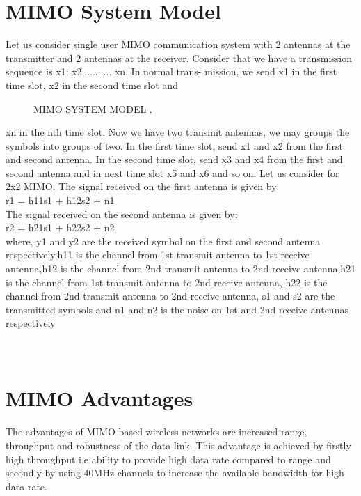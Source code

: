 \documentclass[12pt]{report}
\begin{document}
\section*{MIMO System Model}
Let us consider single user MIMO communication system with 2 antennas at the transmitter and 2 antennas at the receiver. Consider that
we have a transmission sequence is x1; x2;.......... xn. In normal trans-
mission, we send x1 in the first time slot, x2 in the second time slot and
\begin{figure}[!hbt]
		\begin{center}
		\caption{ MIMO SYSTEM MODEL .}
		\label{fig:tf_plot}
		\end{center}
	\end{figure}
xn in the nth time slot. Now we have two transmit antennas, we may
groups the symbols into groups of two. In the first time slot, send x1
and x2 from the first and second antenna. In the second time slot,
send x3 and x4 from the first and second antenna and in next time slot
x5 and x6 and so on. Let us consider for 2x2 MIMO. The signal received
on the first antenna is given by:\\
r1 = h11s1 + h12s2 + n1 \\
The signal received on the second antenna is given by:\\
r2 = h21s1 + h22s2 + n2\\
where, y1 and y2 are the received symbol on the first and second antenna respectively,h11 is the channel from 1st transmit antenna to 1st
receive antenna,h12 is the channel from 2nd transmit antenna to 2nd
receive antenna,h21 is the channel from 1st transmit antenna to 2nd
receive antenna, h22 is the channel from 2nd transmit antenna to 2nd
receive antenna, s1 and s2 are the transmitted symbols and n1 and n2
is the noise on 1st and 2nd receive antennas respectively\\\\\\



    
    \section*{MIMO Advantages}
    The advantages of MIMO based wireless networks are increased range,
throughput and robustness of the data link. This advantage is achieved
by firstly high throughput i.e ability to provide high data rate compared
to range and secondly by using 40MHz channels to increase the available
bandwidth for high data rate.
\end{document}
